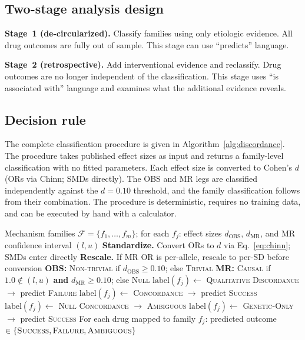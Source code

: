 \documentclass[11pt]{article}
\begin{document}
\subsection{Two-stage analysis design}

\textbf{Stage~1 (de-circularized).} Classify families using only etiologic evidence. All drug outcomes are fully out of sample. This stage can use ``predicts'' language.

\textbf{Stage~2 (retrospective).} Add interventional evidence and reclassify. Drug outcomes are no longer independent of the classification. This stage uses ``is associated with'' language and examines what the additional evidence reveals.

\subsection{Decision rule}

The complete classification procedure is given in Algorithm~\ref{alg:discordance}. The procedure takes published effect sizes as input and returns a family-level classification with no fitted parameters. Each effect size is converted to Cohen's $d$ (ORs via Chinn; SMDs directly). The OBS and MR legs are classified independently against the $d = 0.10$ threshold, and the family classification follows from their combination. The procedure is deterministic, requires no training data, and can be executed by hand with a calculator.

\begin{algorithm}[t]
\caption{Cross-Design Concordance Classification}
\label{alg:discordance}
\begin{algorithmic}[1]
\REQUIRE Mechanism families $\mathcal{F} = \{f_1, \ldots, f_m\}$; for each $f_j$: effect sizes $d_{\text{OBS}}$, $d_{\text{MR}}$, and MR confidence interval $(l, u)$
\medskip
\STATE \textbf{Standardize.} Convert ORs to $d$ via Eq.~\ref{eq:chinn}; SMDs enter directly
\STATE \textbf{Rescale.} If MR OR is per-allele, rescale to per-SD before conversion
\medskip
{}
  \STATE \textbf{OBS:} \textsc{Non-trivial} if $d_{\text{OBS}} \geq 0.10$; else \textsc{Trivial}
  \STATE \textbf{MR:} \textsc{Causal} if $1.0 \notin (l, u)$ \textbf{and} $d_{\text{MR}} \geq 0.10$; else \textsc{Null}
    \STATE $\text{label}(f_j) \leftarrow$ \textsc{Qualitative Discordance} $\rightarrow$ predict \textsc{Failure}
    \STATE $\text{label}(f_j) \leftarrow$ \textsc{Concordance} $\rightarrow$ predict \textsc{Success}
    \STATE $\text{label}(f_j) \leftarrow$ \textsc{Null Concordance} $\rightarrow$ \textsc{Ambiguous}
    \STATE $\text{label}(f_j) \leftarrow$ \textsc{Genetic-Only} $\rightarrow$ predict \textsc{Success}
  \ENDIF
\ENDFOR
\medskip
\ENSURE For each drug mapped to family $f_j$: predicted outcome $\in \{\textsc{Success}, \textsc{Failure}, \textsc{Ambiguous}\}$
\end{algorithmic}
\end{algorithm}
\end{document}
